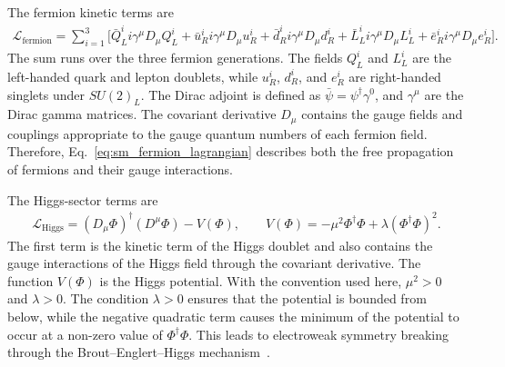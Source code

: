 The fermion kinetic terms are
\begin{align}
    \mathcal{L}_{\mathrm{fermion}}
    =
    \sum_{i=1}^{3}
    \bigg[
        \bar{Q}_{L}^{i} i\gamma^{\mu}D_{\mu}Q_{L}^{i}
        +
        \bar{u}_{R}^{i} i\gamma^{\mu}D_{\mu}u_{R}^{i}
        +
        \bar{d}_{R}^{i} i\gamma^{\mu}D_{\mu}d_{R}^{i}
        +
        \bar{L}_{L}^{i} i\gamma^{\mu}D_{\mu}L_{L}^{i}
        +
        \bar{e}_{R}^{i} i\gamma^{\mu}D_{\mu}e_{R}^{i}
    \bigg].
    \label{eq:sm_fermion_lagrangian}
\end{align}
The sum runs over the three fermion generations. 
The fields $Q_{L}^{i}$ and $L_{L}^{i}$ are the left-handed quark and lepton doublets, while $u_{R}^{i}$, $d_{R}^{i}$, and $e_{R}^{i}$ are right-handed singlets under $SU(2)_{L}$. 
The Dirac adjoint is defined as $\bar{\psi}=\psi^{\dagger}\gamma^{0}$, and $\gamma^{\mu}$ are the Dirac gamma matrices. 
The covariant derivative $D_{\mu}$ contains the gauge fields and couplings appropriate to the gauge quantum numbers of each fermion field. 
Therefore, Eq.~\eqref{eq:sm_fermion_lagrangian} describes both the free propagation of fermions and their gauge interactions.

The Higgs-sector terms are
\begin{align}
    \mathcal{L}_{\mathrm{Higgs}}
    =
    (D_{\mu}\Phi)^{\dagger}(D^{\mu}\Phi)
    -
    V(\Phi),
    \qquad
    V(\Phi)
    =
    -
    \mu^{2}\Phi^{\dagger}\Phi
    +
    \lambda(\Phi^{\dagger}\Phi)^{2}.
    \label{eq:sm_higgs_lagrangian}
\end{align}
The first term is the kinetic term of the Higgs doublet and also contains the gauge interactions of the Higgs field through the covariant derivative. 
The function $V(\Phi)$ is the Higgs potential. 
With the convention used here, $\mu^{2}>0$ and $\lambda>0$. 
The condition $\lambda>0$ ensures that the potential is bounded from below, while the negative quadratic term causes the minimum of the potential to occur at a non-zero value of $\Phi^{\dagger}\Phi$. 
This leads to electroweak symmetry breaking through the Brout--Englert--Higgs mechanism~\cite{EnglertBrout1964,Higgs1964,GuralnikHagenKibble1964}.

